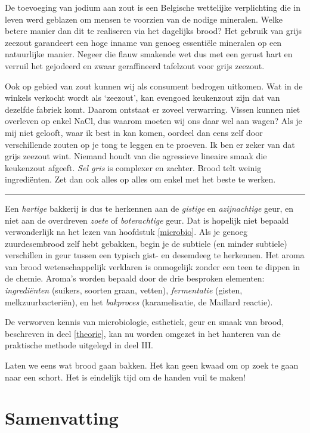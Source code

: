 \documentclass[
  11pt,
  dutch,
]{memoir}
\begin{document}
De toevoeging van jodium aan zout is een Belgische wettelijke
verplichting die in leven werd geblazen om mensen te voorzien van de
nodige mineralen. Welke betere manier dan dit te realiseren via het
dagelijks brood? Het gebruik van grijs zeezout garandeert een hoge
inname van genoeg essentiële mineralen op een natuurlijke manier. Negeer
die flauw smakende wet dus met een gerust hart en verruil het gejodeerd
en zwaar geraffineerd tafelzout voor grijs zeezout.

Ook op gebied van zout kunnen wij als consument bedrogen uitkomen. Wat
in de winkels verkocht wordt als `zeezout', kan evengoed keukenzout zijn
dat van dezelfde fabriek komt. Daarom ontstaat er zoveel verwarring.
Vissen kunnen niet overleven op enkel NaCl, dus waarom moeten wij ons
daar wel aan wagen? Als je mij niet gelooft, waar ik best in kan komen,
oordeel dan eens zelf door verschillende zouten op je tong te leggen en
te proeven. Ik ben er zeker van dat grijs zeezout wint. Niemand houdt
van die agressieve lineaire smaak die keukenzout afgeeft. \emph{Sel
gris} is complexer en zachter. Brood telt weinig ingrediënten. Zet dan
ook alles op alles om enkel met het beste te werken.

\pfbreak

Een \emph{hartige} bakkerij is dus te herkennen aan de \emph{gistige} en
\emph{azijnachtige} geur, en niet aan de overdreven \emph{zoete} of
\emph{boterachtige} geur. Dat is hopelijk niet bepaald verwonderlijk na
het lezen van hoofdstuk \ref{microbio}. Als je genoeg zuurdesembrood
zelf hebt gebakken, begin je de subtiele (en minder subtiele)
verschillen in geur tussen een typisch gist- en desemdeeg te herkennen.
Het aroma van brood wetenschappelijk verklaren is onmogelijk zonder een
teen te dippen in de chemie. Aroma's worden bepaald door de drie
besproken elementen: \emph{ingrediënten} (suikers, soorten graan,
vetten), \emph{fermentatie} (gisten, melkzuurbacteriën), en het
\emph{bakproces} (karamelisatie, de Maillard reactie).

De verworven kennis van microbiologie, esthetiek, geur en smaak van
brood, beschreven in deel \ref{theorie}, kan nu worden omgezet in het
hanteren van de praktische methode uitgelegd in deel III.

Laten we eens wat brood gaan bakken. Het kan geen kwaad om op zoek te
gaan naar een schort. Het is eindelijk tijd om de handen vuil te maken!

\newpage

\hypertarget{samenvatting-2}{%
\section{Samenvatting}\label{samenvatting-2}}
\end{document}
